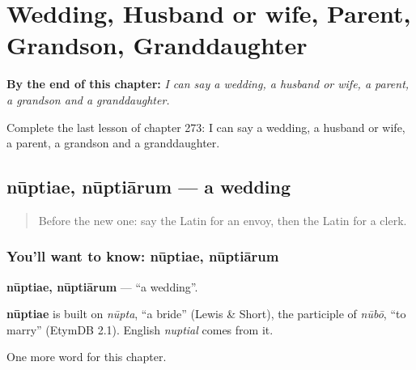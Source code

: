 
\chapter{Wedding, Husband or wife, Parent, Grandson, Granddaughter}
\label{ch:la-wedding-husband-or-wife-parent-grandson-granddaughter}

\begin{chapteropening}
\textbf{By the end of this chapter:} \emph{I can say a wedding, a husband or wife, a parent, a grandson and a granddaughter.}

Complete the last lesson of chapter 273: I can say a wedding, a husband or wife, a parent, a grandson and a granddaughter.
\end{chapteropening}

\section[nūptiae, nūptiārum]{nūptiae, nūptiārum — a wedding}

\label{lesson:LA-C273-nuptiae}



\begin{quote}
Before the new one: say the Latin for an envoy, then the Latin for a clerk.
\end{quote}

\subsection*{You'll want to know: nūptiae, nūptiārum}
\textbf{nūptiae, nūptiārum} — \textquotedblleft{}a wedding\textquotedblright{}.

\begin{cousinweb}
\textbf{nūptiae} is built on \emph{nūpta}, \textquotedblleft{}a bride\textquotedblright{} (Lewis \& Short), the participle of \emph{nūbō}, \textquotedblleft{}to marry\textquotedblright{} (EtymDB 2.1). English \emph{nuptial} comes from it.
\end{cousinweb}

\begin{grammarlens}[title={What you've built}]
One more word for this chapter.
\end{grammarlens}

